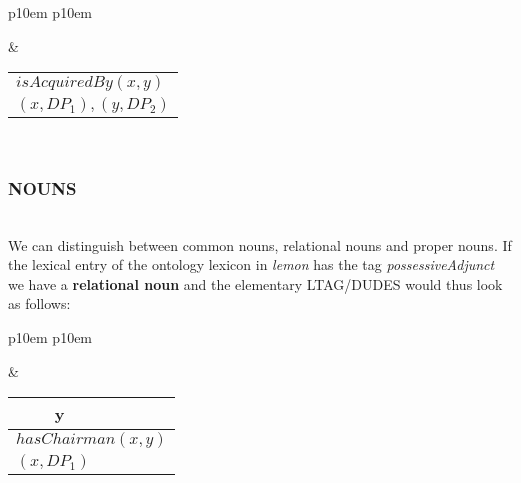 \medskip
\begin{center}
\begin{tabular}{ p{10em} p{10em} }
	\label{tbl:grammar.acquire}
	
	\begin{center}
		\begin{tikzpicture}
		\Tree [.S [.DP$_1\downarrow$ ] [.VP [.V acquire ] DP$_2\downarrow$ ] ]	
		\end{tikzpicture}
	\end{center}
	
	&

	\begin{center}
		\begin{tabular}{|c|l|}
			\hline
			\mbox{} & \mbox{}\\
			\hline
			\multicolumn{2}{|l|}{
				$isAcquiredBy(x,y)$
			} \\
			\hline
			\multicolumn{2}{|l|}{
				$(x,DP_{1}),(y,DP_{2})$
			} \\
			\hline
		\end{tabular}
	\end{center}	
	\\
\end{tabular}
\end{center}
\medskip

\subsubsection{NOUNS}\mbox{}\\
We can distinguish between common nouns, relational nouns and proper nouns. If the lexical entry of the ontology lexicon in \textit{lemon} has the tag \textit{possessiveAdjunct} we have a \textbf{relational noun} and the elementary LTAG/DUDES would thus look as follows: 

\medskip
\begin{center}
\begin{tabular}{ p{10em} p{10em} }
	\label{tbl:grammar.chairmanOf}
	
	\begin{center}
		\begin{tikzpicture}
		\Tree [.NP [.N chairman ] [.PP [.P of ] DP$_1\downarrow$ ] ]
		\end{tikzpicture}
	\end{center}
		
	&
	
	\begin{center}
		\begin{tabular}{|c|l|}
			\hline
			y & \mbox{}\\ 
			\hline
			\multicolumn{2}{|l|}{
				$hasChairman(x,y)$
			} \\
			\hline
			\multicolumn{2}{|l|}{
				$(x,DP_{1})$
			} \\
			\hline
		\end{tabular}
	\end{center}	
	\\
\end{tabular}
\end{center}
\medskip

